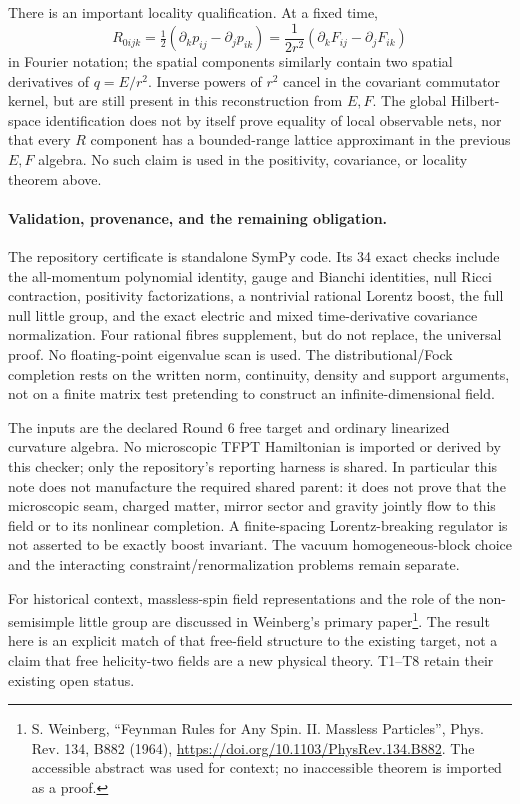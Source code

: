 There is an important locality qualification. At a fixed time,
\[
 R_{0ijk}=\tfrac12(\partial_k p_{ij}-\partial_j p_{ik})
          =\frac1{2r^2}(\partial_kF_{ij}-\partial_jF_{ik})
\]
in Fourier notation; the spatial components similarly contain two spatial
derivatives of $q=E/r^2$. Inverse powers of $r^2$ cancel in the covariant
commutator kernel, but are still present in this reconstruction from $E,F$.
The global Hilbert-space identification does not by itself prove equality
of local observable nets, nor that every $R$ component has a bounded-range
lattice approximant in the previous $E,F$ algebra. No such claim is used
in the positivity, covariance, or locality theorem above.

\paragraph{Validation, provenance, and the remaining obligation.}
The repository certificate  is standalone
SymPy code. Its 34 exact checks include the all-momentum polynomial identity,
gauge and Bianchi identities, null Ricci contraction, positivity
factorizations, a nontrivial rational Lorentz boost, the full null little
group, and the exact electric and mixed time-derivative covariance normalization. Four rational
fibres supplement, but do not replace, the universal proof. No floating-point
eigenvalue scan is used. The distributional/Fock completion rests on the
written norm, continuity, density and support arguments, not on a finite
matrix test pretending to construct an infinite-dimensional field.

The inputs are the declared Round 6 free target and ordinary linearized
curvature algebra. No microscopic TFPT Hamiltonian is imported or derived
by this checker; only the repository's reporting harness is shared.
In particular this note does not manufacture the required
shared parent: it does not prove that the microscopic seam, charged matter,
mirror sector and gravity jointly flow to this field or to its nonlinear
completion. A finite-spacing Lorentz-breaking regulator is not asserted
to be exactly boost invariant. The vacuum homogeneous-block choice and
the interacting constraint/renormalization problems remain separate.

For historical context, massless-spin field representations and the role
of the non-semisimple little group are discussed in Weinberg's primary
paper\footnote{S. Weinberg, ``Feynman Rules for Any Spin. II. Massless
Particles'', Phys. Rev. 134, B882 (1964),
\url{https://doi.org/10.1103/PhysRev.134.B882}. The accessible abstract was
used for context; no inaccessible theorem is imported as a proof.}.
The result here is an explicit match of that free-field structure to the
existing target, not a claim that free helicity-two fields are a new
physical theory. T1--T8 retain their existing open status.
\endgroup
